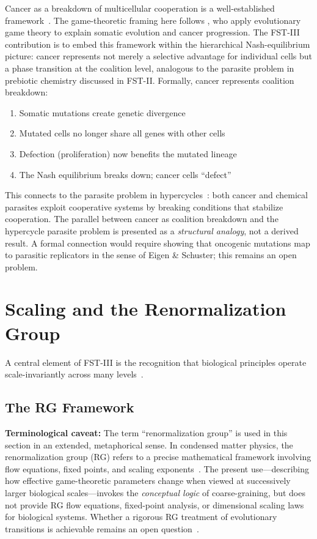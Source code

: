 \documentclass[12pt,a4paper]{article}
\theoremstyle{remark}
\begin{document}
Cancer as a breakdown of multicellular cooperation is a well-established framework~\citep{AktipisCancer}. The game-theoretic framing here follows \citet{AktipisCancer}, who apply evolutionary game theory to explain somatic evolution and cancer progression. The FST-III contribution is to embed this framework within the hierarchical Nash-equilibrium picture: cancer represents not merely a selective advantage for individual cells but a phase transition at the coalition level, analogous to the parasite problem in prebiotic chemistry discussed in FST-II. Formally, cancer represents coalition breakdown:
\begin{enumerate}
    \item Somatic mutations create genetic divergence
    \item Mutated cells no longer share all genes with other cells
    \item Defection (proliferation) now benefits the mutated lineage
    \item The Nash equilibrium breaks down; cancer cells ``defect''
\end{enumerate}

This connects to the parasite problem in hypercycles~\citep{FSTII}: both cancer and chemical parasites exploit cooperative systems by breaking conditions that stabilize cooperation. The parallel between cancer as coalition breakdown and the hypercycle parasite problem is presented as a \emph{structural analogy}, not a derived result. A formal connection would require showing that oncogenic mutations map to parasitic replicators in the sense of Eigen \& Schuster; this remains an open problem.

\section{Scaling and the Renormalization Group}
\label{sec:renormalization}

A central element of FST-III is the recognition that biological principles operate scale-invariantly across many levels~\citep{ScaleRGFrontiers,ScaleRGResearch}.

\subsection{The RG Framework}

\textbf{Terminological caveat:} The term ``renormalization group'' is used in this section in an extended, metaphorical sense. In condensed matter physics, the renormalization group (RG) refers to a precise mathematical framework involving flow equations, fixed points, and scaling exponents~\citep{ScaleRGResearch}. The present use---describing how effective game-theoretic parameters change when viewed at successively larger biological scales---invokes the \emph{conceptual logic} of coarse-graining, but does not provide RG flow equations, fixed-point analysis, or dimensional scaling laws for biological systems. Whether a rigorous RG treatment of evolutionary transitions is achievable remains an open question~\citep{ScaleRGFrontiers}.
\end{document}
